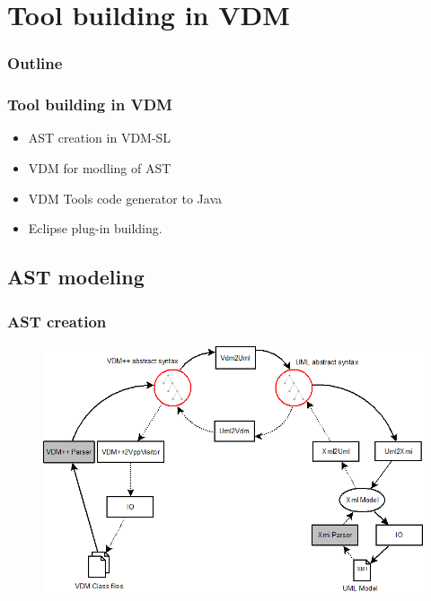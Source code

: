 %
%
\section{Tool building in VDM}
%
%
\begin{frame}
  \frametitle{Outline}
  \tableofcontents[current]
\end{frame}



%
%
\frame
{
  \frametitle{Tool building in VDM}
\begin{center}
  \begin{itemize}
  		\item AST creation in VDM-SL
  		\item VDM for modling of AST
  		\item VDM Tools code generator to Java
  		\item Eclipse plug-in building.
	  	
  \end{itemize}

\end{center}
}







\subsection{AST modeling}

%
%
\frame
{
  \frametitle{AST creation}

\begin{center}
\begin{figure}
\includegraphics[width=\textwidth]{images/OverviewOverMappingAST.png}
\end{figure}
\end{center}
}


